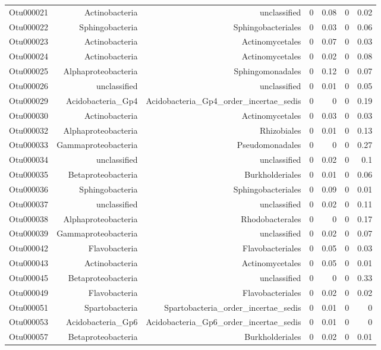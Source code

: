 \begin{table}[ht]
\begin{tabular}{crrrrrr}
  Otu000021 & Actinobacteria & unclassified & 0 & 0.08 & 0 & 0.02 \\ 
  Otu000022 & Sphingobacteria & Sphingobacteriales & 0 & 0.03 & 0 & 0.06 \\ 
  Otu000023 & Actinobacteria & Actinomycetales & 0 & 0.07 & 0 & 0.03 \\ 
  Otu000024 & Actinobacteria & Actinomycetales & 0 & 0.02 & 0 & 0.08 \\ 
  Otu000025 & Alphaproteobacteria & Sphingomonadales & 0 & 0.12 & 0 & 0.07 \\ 
  Otu000026 & unclassified & unclassified & 0 & 0.01 & 0 & 0.05 \\ 
  Otu000029 & Acidobacteria\_Gp4 & Acidobacteria\_Gp4\_order\_incertae\_sedis & 0 & 0 & 0 & 0.19 \\ 
  Otu000030 & Actinobacteria & Actinomycetales & 0 & 0.03 & 0 & 0.03 \\ 
  Otu000032 & Alphaproteobacteria & Rhizobiales & 0 & 0.01 & 0 & 0.13 \\ 
  Otu000033 & Gammaproteobacteria & Pseudomonadales & 0 & 0 & 0 & 0.27 \\ 
  Otu000034 & unclassified & unclassified & 0 & 0.02 & 0 & 0.1 \\ 
  Otu000035 & Betaproteobacteria & Burkholderiales & 0 & 0.01 & 0 & 0.06 \\ 
  Otu000036 & Sphingobacteria & Sphingobacteriales & 0 & 0.09 & 0 & 0.01 \\ 
  Otu000037 & unclassified & unclassified & 0 & 0.02 & 0 & 0.11 \\ 
  Otu000038 & Alphaproteobacteria & Rhodobacterales & 0 & 0 & 0 & 0.17 \\ 
  Otu000039 & Gammaproteobacteria & unclassified & 0 & 0.02 & 0 & 0.07 \\ 
  Otu000042 & Flavobacteria & Flavobacteriales & 0 & 0.05 & 0 & 0.03 \\ 
  Otu000043 & Actinobacteria & Actinomycetales & 0 & 0.05 & 0 & 0.01 \\ 
  Otu000045 & Betaproteobacteria & unclassified & 0 & 0 & 0 & 0.33 \\ 
  Otu000049 & Flavobacteria & Flavobacteriales & 0 & 0.02 & 0 & 0.02 \\ 
  Otu000051 & Spartobacteria & Spartobacteria\_order\_incertae\_sedis & 0 & 0.01 & 0 & 0 \\ 
  Otu000053 & Acidobacteria\_Gp6 & Acidobacteria\_Gp6\_order\_incertae\_sedis & 0 & 0.01 & 0 & 0 \\ 
  Otu000057 & Betaproteobacteria & Burkholderiales & 0 & 0.02 & 0 & 0.01 \\ 

\end{tabular}
\end{table}
